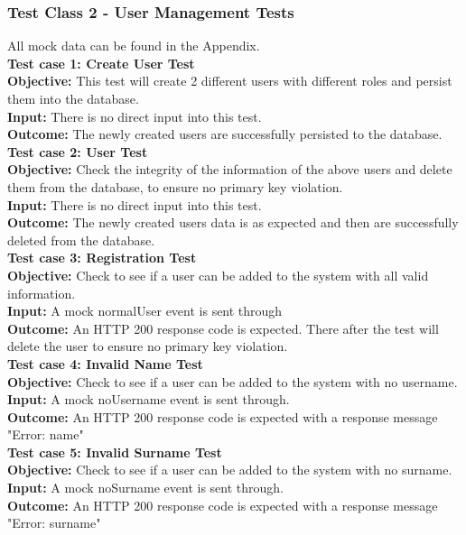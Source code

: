 \documentclass[11pt,a4paper]{article}
\begin{document}
\subsubsection{Test Class 2 - User Management Tests}
All mock data can be found in the Appendix.\\
\textbf{Test case 1: Create User Test} \\
\textbf{Objective: } This test will create 2 different users with different roles and persist them into the database. \\
\textbf{Input: } There is no direct input into this test.\\
\textbf{Outcome: } The newly created users are successfully persisted to the database. \\

\textbf{Test case 2: User Test} \\
\textbf{Objective: } Check the integrity of the information of the above users and delete them from the database, to ensure no primary key violation. \\
\textbf{Input: } There is no direct input into this test.\\
\textbf{Outcome: } The newly created users data is as expected and then are successfully deleted from the database. \\


\textbf{Test case 3: Registration Test} \\
\textbf{Objective: } Check to see if a user can be added to the system with all valid information. \\
\textbf{Input: } A mock normalUser event is sent through\\
\textbf{Outcome: } An HTTP 200 response code is expected. There after the test will delete the user to ensure no primary key violation. \\


\textbf{Test case 4: Invalid Name Test} \\
\textbf{Objective: } Check to see if a user can be added to the system with no username. \\
\textbf{Input: }  A mock noUsername event is sent through.\\
\textbf{Outcome: } An HTTP 200 response code is expected with a response message "Error: name" \\

\textbf{Test case 5: Invalid Surname Test} \\
\textbf{Objective: } Check to see if a user can be added to the system with no surname. \\
\textbf{Input: }  A mock noSurname event is sent through.\\
\textbf{Outcome: } An HTTP 200 response code is expected with a response message "Error: surname" \\
\end{document}
